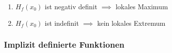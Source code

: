 \documentclass[twoside]{article}
\begin{document}
\begin{enumerate}[]
\begin{enumerate}[]
							\item \begin{math} H_f(x_0) \end{math} ist negativ definit \begin{math} \implies \end{math}  lokales Maximum
							\item \begin{math} H_f(x_0) \end{math} ist indefinit \begin{math} \implies \end{math}  kein lokales Extremum
						\end{enumerate}
				\end{enumerate}
			
			\subsubsection{Implizit definierte Funktionen}
			
\end{document}
